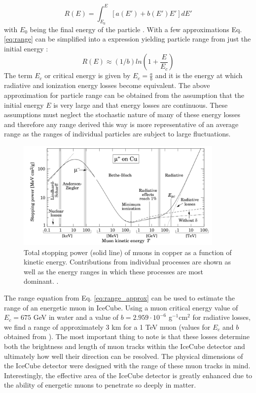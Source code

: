 \documentclass{gatech-thesis}
\begin{document}
\begin{equation}\label{eq:range}
R(E) = \int_{E_0}^{E}[a(E') + b(E')E']dE'
\end{equation}
with $E_0$ being the final energy of the particle \cite{2001ADNDT..78..183G}.
With a few approximations Eq. \ref{eq:range} can be simplified into a expression yielding particle range from just the initial energy \cite{2001ADNDT..78..183G}:
\begin{equation}\label{eq:range_approx}
R(E) \approx (1/b)ln(1+\frac{E}{E_{c}})
\end{equation}
The term $E_{c}$ or critical energy is given by $E_{c}=\frac{a}{b}$ and it is the energy at which radiative and ionization energy losses become equivalent. The above approximation for particle range can be obtained from the assumption that the initial energy $E$ is very large and that energy losses are continuous. These assumptions must neglect the stochastic nature of many of these energy losses and therefore any range derived this way is more representative of an average range as the ranges of individual particles are subject to large fluctuations.

\begin{figure}[ht]
  \begin{center}
    \includegraphics[width=0.9\textwidth,keepaspectratio]{MuonStoppingPower.png}
  \end{center}
  \caption[Muon Stopping Power]{Total stopping power (solid line) of muons in copper as a function of kinetic energy. Contributions from individual processes are shown as well as the energy ranges in which these processes are most dominant. \cite{2001ADNDT..78..183G}.}
  \label{fig:MuonStoppingPower}
\end{figure}

The range equation from Eq. \ref{eq:range_approx} can be used to estimate the range of an energetic muon in IceCube. Using a muon critical energy value of $E_{c}=675$ GeV in water and a value of $b=2.959 \cdot 10^{-6}$ g$^{-1}$cm$^{2}$ for radiative losses, we find a range of approximately 3 km for a 1 TeV muon (values for $E_{c}$ and $b$ obtained from \cite{2001ADNDT..78..183G}). The most important thing to note is that these losses determine both the brightness and length of muon tracks within the IceCube detector and ultimately how well their direction can be resolved. The physical dimensions of the IceCube detector were designed with the range of these muon tracks in mind. Interestingly, the effective area of the IceCube detector is greatly enhanced due to the ability of energetic muons to penetrate so deeply in matter.
\end{document}
